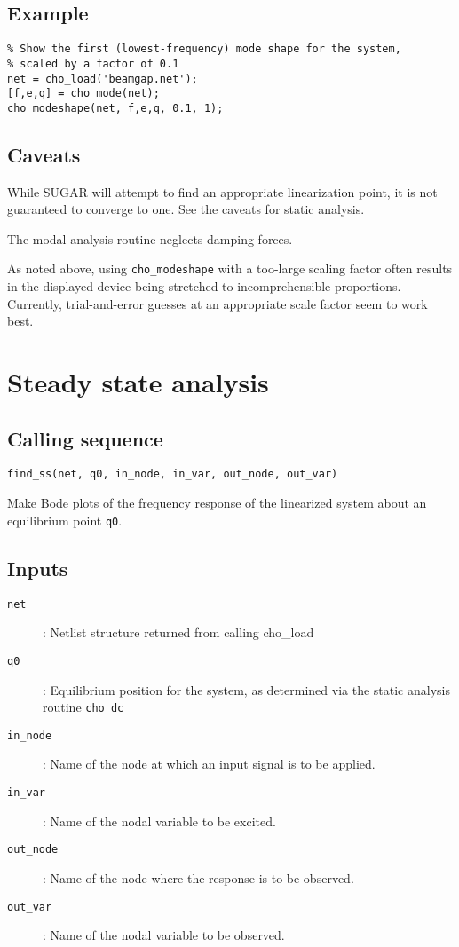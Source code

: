 \subsection*{Example}

\begin{verbatim}
% Show the first (lowest-frequency) mode shape for the system,
% scaled by a factor of 0.1
net = cho_load('beamgap.net');
[f,e,q] = cho_mode(net);
cho_modeshape(net, f,e,q, 0.1, 1);
\end{verbatim}

\subsection*{Caveats}

While SUGAR will attempt to find an appropriate linearization point,
it is not guaranteed to converge to one.  See the caveats for
static analysis.

The modal analysis routine neglects damping forces. 

As noted above, using \texttt{cho\_modeshape} with a too-large scaling
factor often results in the displayed device being stretched to
incomprehensible proportions.  Currently, trial-and-error guesses at
an appropriate scale factor seem to work best.


\section{Steady state analysis}

\subsection*{Calling sequence}

\begin{verbatim}
find_ss(net, q0, in_node, in_var, out_node, out_var)
\end{verbatim}

Make Bode plots of the frequency response of the linearized system about
an equilibrium point \texttt{q0}. 

\subsection*{Inputs}

\begin{description}
\item[\texttt{net}]: 
  Netlist structure returned from calling cho\_load
\item[\texttt{q0}]: 
  Equilibrium position for the system, as determined via the
  static analysis routine \texttt{cho\_dc}
\item[\texttt{in\_node}]:
  Name of the node at which an input signal is to be applied.
\item[\texttt{in\_var}]:
  Name of the nodal variable to be excited.
\item[\texttt{out\_node}]:
  Name of the node where the response is to be observed.
\item[\texttt{out\_var}]:
  Name of the nodal variable to be observed.
\end{description}


